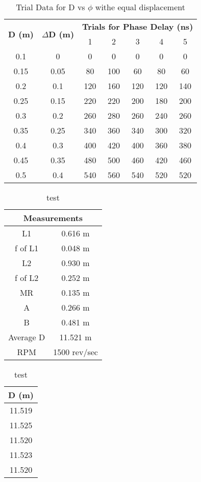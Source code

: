 \documentclass[12pt]{article}
\begin{document}
	\begin{table}[!h]
		\centering
		\caption{Trial Data for D vs $\phi$ withe equal displacement}
		\label{TrialsforDvsPhi_EqualDisplacement}
		\vspace{0.05cm}
		\begin{tabular}{|c|c|c|c|c|c|c|}
			\hline
			\multirow{2}{*}{\textbf{D (m)}} & \multirow{2}{*}{\textbf{$\Delta$D (m)}} & \multicolumn{5}{c|}{\textbf{Trials for Phase Delay (ns)}} \\
			\cline{3-7}
			~ & ~ & 1 & 2 & 3 & 4 & 5 \\
			\hline
			0.1 & 0 & 0 & 0 & 0 & 0 & 0 \\
			\hline
			0.15 & 0.05 & 80 & 100 & 60 & 80 & 60 \\
			\hline
			0.2 & 0.1 & 120 & 160 & 120 & 120 & 140 \\
			\hline
			0.25 & 0.15 & 220 & 220 & 200 & 180 & 200 \\
			\hline
			0.3 & 0.2 & 260 & 280 & 260 & 240 & 260 \\
			\hline
			0.35 & 0.25 & 340 & 360 & 340 & 300 & 320 \\
			\hline
			0.4 & 0.3 & 400 & 420 & 400 & 360 & 380 \\
			\hline
			0.45 & 0.35 & 480 & 500 & 460 & 420 & 460 \\
			\hline
			0.5 & 0.4 & 540 & 560 & 540 & 520 & 520 \\
			\hline
		\end{tabular}
	\end{table}
	
	\begin{table}[!h]
		\centering
		\caption{test}
		\label{FocaultMeasurements}
		\vspace{0.05cm}
		\begin{tabular}{|c|c|}
			\hline
			\multicolumn{2}{|c|}{\textbf{Measurements}} \\
			\hline
			L1 & 0.616 m \\
			\hline
			f of L1 & 0.048 m \\
			\hline
			L2 & 0.930 m \\
			\hline
			f of L2 & 0.252 m \\
			\hline
			MR & 0.135 m \\
			\hline
			A & 0.266 m \\
			\hline
			B & 0.481 m \\
			\hline
			Average D & 11.521 m \\
			\hline
			RPM & 1500 rev/sec \\
			\hline
		\end{tabular}
		\quad
		\begin{tabular}{|c|}
			\hline
			\textbf{D (m)} \\
			\hline
			11.519 \\
			\hline
			11.525 \\
			\hline
			11.520 \\
			\hline
			11.523 \\
			\hline
			11.520 \\
			\hline
		\end{tabular}
	\end{table}
	
\end{document}
